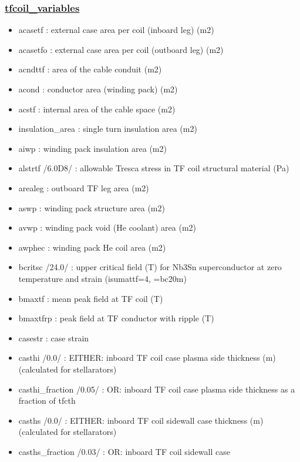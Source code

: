 \documentclass[]{article}
\begin{document}
\begin{itemize}
  \subsubsection{\texorpdfstring{\href{tfcoil_variables.html}{tfcoil\_variables}}{tfcoil\_variables}}\label{tfcoil_variables}

  \begin{itemize}
  \item
    acasetf : external case area per coil (inboard leg) (m2)
  \item
    acasetfo : external case area per coil (outboard leg) (m2)
  \item
    acndttf : area of the cable conduit (m2)
  \item
    acond : conductor area (winding pack) (m2)
  \item
    acstf : internal area of the cable space (m2)
  \item
    insulation\_area : single turn insulation area (m2)
  \item
    aiwp : winding pack insulation area (m2)
  \item
    alstrtf /6.0D8/ : allowable Tresca stress in TF coil structural
    material (Pa)
  \item
    arealeg : outboard TF leg area (m2)
  \item
    aswp : winding pack structure area (m2)
  \item
    avwp : winding pack void (He coolant) area (m2)
  \item
    awphec : winding pack He coil area (m2)
  \item
    bcritsc /24.0/ : upper critical field (T) for Nb3Sn superconductor
    at zero temperature and strain (isumattf=4, =bc20m)
  \item
    bmaxtf : mean peak field at TF coil (T)
  \item
    bmaxtfrp : peak field at TF conductor with ripple (T)
  \item
    casestr : case strain
  \item
    casthi /0.0/ : EITHER: inboard TF coil case plasma side thickness
    (m) (calculated for stellarators)
  \item
    casthi\_fraction /0.05/ : OR: inboard TF coil case plasma side
    thickness as a fraction of tfcth
  \item
    casths /0.0/ : EITHER: inboard TF coil sidewall case thickness (m)
    (calculated for stellarators)
  \item
    casths\_fraction /0.03/ : OR: inboard TF coil sidewall case

\end{itemize}
\end{itemize}
\end{document}
